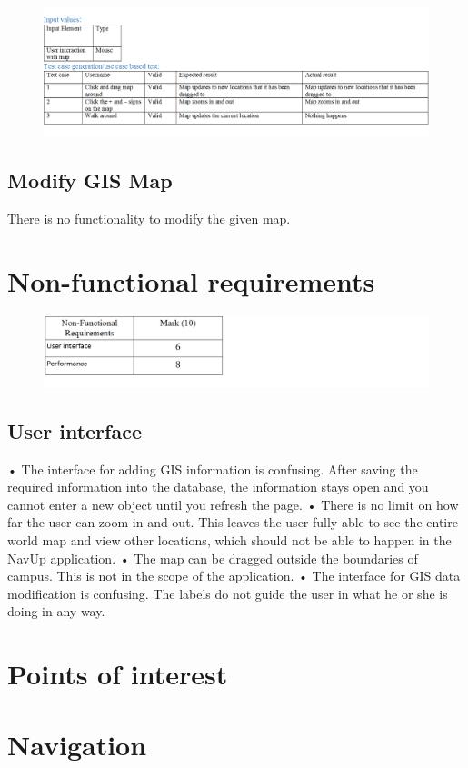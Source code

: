 \documentclass[english]{article}
\begin{document}
\begin{figure}[H]

\hspace*{-2.5cm} 

\includegraphics[width=180mm]{UpdateGISMap.png}

\end{figure}

\subsection{Modify GIS Map}

There is no functionality to modify the given map.


\section{Non-functional requirements}
\begin{figure}[H]

\hspace*{-2.5cm} 

\includegraphics[width=180mm]{NFRMarks.png}

\end{figure}
\subsection{User interface}
•	The interface for adding GIS information is confusing. After saving the required information into the database, the information stays open and you cannot enter a new object until you refresh the page.
•	There is no limit on how far the user can zoom in and out. This leaves the user fully able to see the entire world map and view other locations, which should not be able to happen in the NavUp application.
•	The map can be dragged outside the boundaries of campus. This is not in the scope of the application.
•	The interface for GIS data modification is confusing. The labels do not guide the user in what he or she is doing in any way. 


\section{Points of interest}



\section{Navigation}
\end{document}
